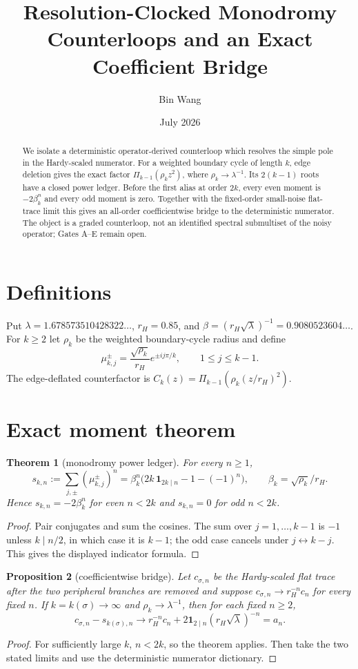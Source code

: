 \documentclass[11pt]{article}
\title{Resolution-Clocked Monodromy Counterloops and an Exact Coefficient Bridge}
\author{Bin Wang}\date{July 2026}
\newtheorem{theorem}{Theorem}[section]
\newtheorem{proposition}[theorem]{Proposition}
\theoremstyle{remark}\newtheorem{remark}[theorem]{Remark}
\begin{document}
\maketitle
\begin{abstract}
We isolate a deterministic operator-derived counterloop which resolves the
simple pole in the Hardy-scaled numerator.  For a weighted boundary cycle of
length $k$, edge deletion gives the exact factor
$\Pi_{k-1}(\rho_k z^2)$, where $\rho_k\to\lambda^{-1}$.
Its $2(k-1)$ roots have a closed power ledger.  Before the first alias at
order $2k$, every even moment is $-2\beta_k^n$ and every odd moment is zero.
Together with the fixed-order small-noise flat-trace limit this gives an
all-order coefficientwise bridge to the deterministic numerator.  The object
is a graded counterloop, not an identified spectral submultiset of the noisy
operator; Gates A--E remain open.
\end{abstract}
\section{Definitions}
Put $\lambda=1.678573510428322\ldots$, $r_H=0.85$, and
$\beta=(r_H\sqrt\lambda)^{-1}=0.9080523604\ldots$.  For $k\ge2$ let
$\rho_k$ be the weighted boundary-cycle radius and define
\[
 \mu_{k,j}^{\pm}=\frac{\sqrt{\rho_k}}{r_H}e^{\pm ij\pi/k},
 \qquad 1\le j\le k-1.
\]
The edge-deflated counterfactor is
$C_k(z)=\Pi_{k-1}(\rho_k(z/r_H)^2)$.
\section{Exact moment theorem}
\begin{theorem}[monodromy power ledger]
For every $n\ge1$,
\[
 s_{k,n}:=\sum_{j,\pm}(\mu_{k,j}^{\pm})^n
 =\beta_k^n\bigl(2k\,\mathbf1_{2k\mid n}-1-(-1)^n\bigr),
 \qquad \beta_k=\sqrt{\rho_k}/r_H.
\]
Hence $s_{k,n}=-2\beta_k^n$ for even $n<2k$ and $s_{k,n}=0$ for odd
$n<2k$.
\end{theorem}
\begin{proof}
Pair conjugates and sum the cosines.  The sum over $j=1,\ldots,k-1$ is
$-1$ unless $k\mid n/2$, in which case it is $k-1$; the odd case cancels
under $j\leftrightarrow k-j$.  This gives the displayed indicator formula.
\end{proof}
\begin{proposition}[coefficientwise bridge]
Let $c_{\sigma,n}$ be the Hardy-scaled flat trace after the two peripheral
branches are removed and suppose $c_{\sigma,n}\to r_H^{-n}c_n$ for every fixed
$n$.  If $k=k(\sigma)\to\infty$ and $\rho_k\to\lambda^{-1}$, then for each
fixed $n\ge2$,
\[
 c_{\sigma,n}-s_{k(\sigma),n}\longrightarrow
 r_H^{-n}c_n+2\mathbf1_{2\mid n}(r_H\sqrt\lambda)^{-n}=a_n.
\]
\end{proposition}
\begin{proof}
For sufficiently large $k$, $n<2k$, so the theorem applies.  Then take the
two stated limits and use the deterministic numerator dictionary.
\end{proof}
\end{document}
